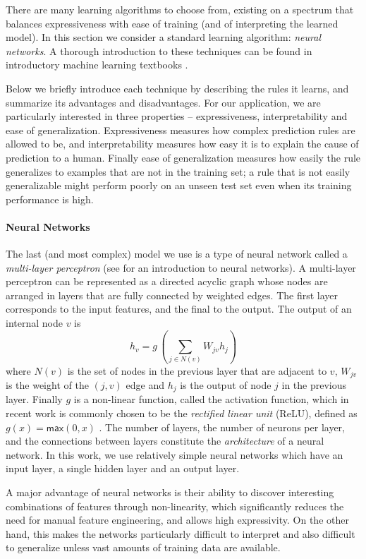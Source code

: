 There are many learning algorithms to choose from, existing on a spectrum that
balances expressiveness with ease of training (and of interpreting the learned
model). In this section we consider a standard learning algorithm: \emph{neural
networks}. A thorough introduction to these techniques can be found in
introductory machine learning textbooks \citep[\eg][]{Hastie2009-bn}.

Below we briefly introduce each technique by describing the rules it learns, and
summarize its advantages and disadvantages. For our application, we are
particularly interested in three properties -- expressiveness, interpretability
and ease of generalization. Expressiveness measures how complex prediction rules
are allowed to be, and interpretability measures how easy it is to explain the
cause of prediction to a human. Finally ease of generalization measures how
easily the rule generalizes to examples that are not in the training set; a rule
that is not easily generalizable might perform poorly on an unseen test set even
when its training performance is high.


\paragraph{Neural Networks}
The last (and most complex) model we use is a type of neural network called a
\emph{multi-layer perceptron} (see \citealt{Nielsen2015-pu} for an introduction
to neural networks). A multi-layer perceptron can be represented as a directed
acyclic graph whose nodes are arranged in layers that are fully connected by
weighted edges. The first layer corresponds to the input features, and the final
to the output.
The output of an internal node $v$ is
\[ h_v = g\,(\sum_{j \in N(v)}\!W_{jv} h_j ) \] where $N(v)$ is the set of nodes
in the previous layer that are adjacent to $v$, $W_{jv}$ is the weight of the
$(j, v)$ edge and $h_j$ is the output of node $j$ in the previous layer. Finally
$g$ is a non-linear function, called the activation function, which in recent
work is commonly chosen to be the \emph{rectified linear unit} (ReLU), defined
as $g(x) = \mathsf{max}(0,x)$ \citep{Nair2010-xg}. The number of layers, the
number of neurons per layer, and the connections between layers constitute the
\emph{architecture} of a neural network. In this work, we use relatively simple
neural networks which have an input layer, a single hidden layer and an output
layer.

A major advantage of neural networks is their ability to discover interesting
combinations of features through non-linearity, which significantly reduces the
need for manual feature engineering, and allows high expressivity. On the other
hand, this makes the networks particularly difficult to interpret and also
difficult to generalize unless vast amounts of training data are available.

\lstMakeShortInline[mathescape=true]{|}
